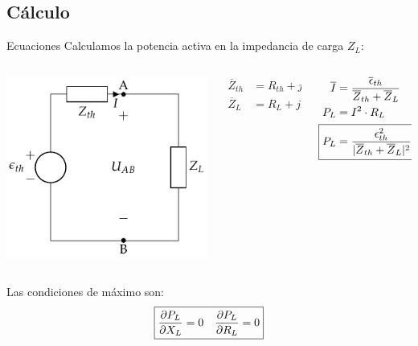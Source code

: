 \documentclass[aspectratio=169, usenames,svgnames,dvipsnames]{beamer}
\begin{document}
\subsection{Cálculo}
\label{sec:org08ddc7b}
\begin{frame}[label={sec:orgd2728b9}]{Ecuaciones}
Calculamos la potencia activa en la impedancia de carga \(Z_L\):
\begin{columns}
\begin{column}{0.3\columnwidth}
\begin{center}
\includegraphics[height=0.45\textheight]{../figs/EquivalenteThevenin0.pdf}
\end{center}
\end{column}

\begin{column}{0.2\columnwidth}
\begin{align*}
  \overline{Z}_{th} &= R_{th} + jX_{th}\\
  \overline{Z}_L &= R_L + jX_L\\
\end{align*}
\end{column}

\begin{column}{0.4\columnwidth}
\begin{align*}
\overline{I} &= \frac{\overline{\epsilon}_{th}}{\overline{Z}_{th} + \overline{Z}_L}\\
P_L &= I^2 \cdot R_L\\
\Aboxed{P_L &= \frac{\epsilon^2_{th}}{|\overline{Z}_{th} + \overline{Z}_L|^2} \cdot R_L}
\end{align*}
\end{column}
\end{columns}

Las condiciones de máximo son: 
\[
  \boxed{%
    \diffp{P_L}{X_L} = 0 \quad%
    \diffp{P_L}{R_L} = 0%
  }
\]
\end{frame}
\end{document}
